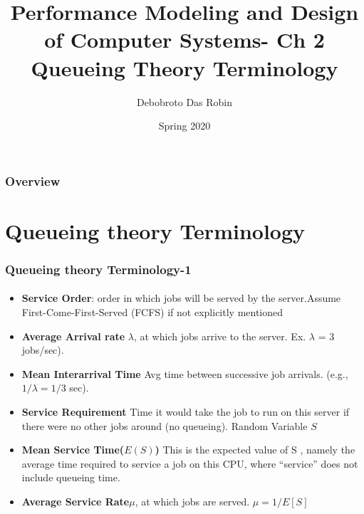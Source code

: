 \documentclass{beamer}
\title{Performance Modeling and
Design of Computer Systems- Ch 2 \\
Queueing Theory Terminology}
\author{Debobroto Das Robin} %
\institute{Kent State University}
\date{Spring 2020}
\begin{document}
\begin{frame}
        \titlepage
        \begin{center}
    \href{mailto:drobin@kent.edu}{}
        \end{center}
\end{frame}

\begin{frame}
\frametitle{Overview} %
\tableofcontents %
\end{frame}

\section{Queueing theory Terminology}

\begin{frame}
    \frametitle{Queueing theory Terminology-1}
    \framesubtitle{\textbf{\textit{}}}
	\begin{itemize}
		\item \textbf{Service Order}:  order in which jobs will be served by 				the server.Assume First-Come-First-Served (FCFS) if not explicitly 				mentioned
		\item \textbf{Average Arrival rate} $\lambda$, at which jobs arrive to 					the server. Ex.  $\lambda$ = 3 jobs/sec).
		\item \textbf{Mean Interarrival Time} Avg time between successive job 				arrivals. (e.g., $1/\lambda = 1/3$  sec).
		\item \textbf{Service Requirement} Time it would take the job to run on 		this server if there were no other jobs around (no queueing). Random 				Variable $S$
		
		\item \textbf{Mean Service Time($E(S)$)} This is the expected value of 				S , namely the average time required to service a job on this CPU, 						where “service” does not include queueing time. 

		\item \textbf{Average Service Rate}$\mu$, at which jobs are served. 
				$\mu = 1/{E[S]}$ 					
				  
	\end{itemize}	    
    
\end{frame}
\end{document}
